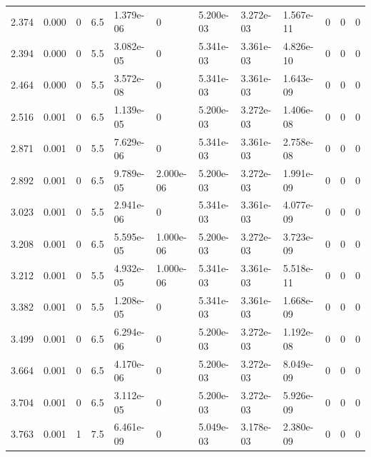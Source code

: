 \documentclass[preview]{standalone}
\begin{document}
{{\begin{tabular}{L{1.2cm}C{1.2cm} C{0.3cm}C{0.5cm} C{1.4cm}C{1.4cm} C{1.4cm}C{1.4cm} C{1.6cm}C{1.6cm} C{1.6cm}C{1.6cm}}
  2.374  &  0.000  & 0     & 6.5 &  1.379e-06  & 0  &  5.200e-03&   3.272e-03& 1.567e-11 & 0   &  0 & 0  \\ 
  2.394  &  0.000  & 0     & 5.5 &  3.082e-05  & 0  &  5.341e-03&   3.361e-03& 4.826e-10 & 0   &  0 & 0  \\ 
  2.464  &  0.000  & 0     & 5.5 &  3.572e-08  & 0  &  5.341e-03&   3.361e-03& 1.643e-09 & 0   &  0 & 0  \\ 
  2.516  &  0.001  & 0     & 6.5 &  1.139e-05  & 0  &  5.200e-03&   3.272e-03& 1.406e-08 & 0   &  0 & 0  \\ 
  2.871  &  0.001  & 0     & 5.5 &  7.629e-06  & 0  &  5.341e-03&   3.361e-03& 2.758e-08 & 0   &  0 & 0  \\ 
  2.892  &  0.001  & 0     & 6.5 &  9.789e-05  & 2.000e-06  &  5.200e-03&   3.272e-03& 1.991e-09 & 0   &  0 & 0  \\ 
  3.023  &  0.001  & 0     & 5.5 &  2.941e-06  & 0  &  5.341e-03&   3.361e-03& 4.077e-09 & 0   &  0 & 0  \\ 
  3.208  &  0.001  & 0     & 6.5 &  5.595e-05  & 1.000e-06  &  5.200e-03&   3.272e-03& 3.723e-09 & 0   &  0 & 0  \\ 
  3.212  &  0.001  & 0     & 5.5 &  4.932e-05  & 1.000e-06  &  5.341e-03&   3.361e-03& 5.518e-11 & 0   &  0 & 0  \\ 
  3.382  &  0.001  & 0     & 5.5 &  1.208e-05  & 0  &  5.341e-03&   3.361e-03& 1.668e-09 & 0   &  0 & 0  \\ 
  3.499  &  0.001  & 0     & 6.5 &  6.294e-06  & 0  &  5.200e-03&   3.272e-03& 1.192e-08 & 0   &  0 & 0  \\ 
  3.664  &  0.001  & 0     & 6.5 &  4.170e-06  & 0  &  5.200e-03&   3.272e-03& 8.049e-09 & 0   &  0 & 0  \\ 
  3.704  &  0.001  & 0     & 6.5 &  3.112e-05  & 0  &  5.200e-03&   3.272e-03& 5.926e-09 & 0   &  0 & 0  \\ 
  3.763  &  0.001  & 1     & 7.5 &  6.461e-09  & 0  &  5.049e-03&   3.178e-03& 2.380e-09 & 0   &  0 & 0  \\ 
\hline 
\end{tabular} 

}}
\end{document}
